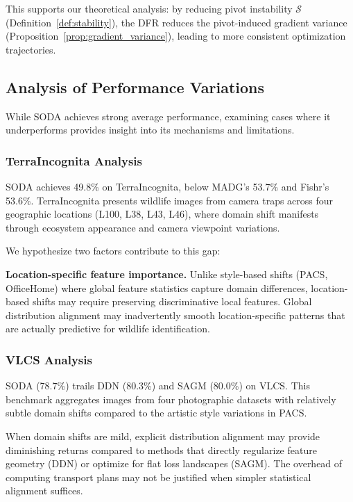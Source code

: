 \documentclass[preprint,12pt]{elsarticle}
\providecommand{\DIFadd}[1]{{\protect\color{blue} \sf #1}} %
\providecommand{\DIFaddbegin}{} %
\providecommand{\DIFaddend}{} %
\newcommand{\DIFaddincludegraphics}[2][]{{\color{blue}\fbox{\DIFOincludegraphics[#1]{#2}}}} %
\DeclareRobustCommand{\DIFaddbegin}{\DIFOaddbegin \let\includegraphics\DIFaddincludegraphics} %
\DeclareRobustCommand{\DIFaddend}{\DIFOaddend \let\includegraphics\DIFOincludegraphics} %
\begin{document}
\DIFadd{This }\DIFaddend supports our theoretical analysis: by reducing pivot instability $\mathcal{S}$ (Definition~\ref{def:stability}), the DFR reduces \DIFaddbegin \DIFadd{the pivot-induced }\DIFaddend gradient variance (Proposition~\ref{prop:gradient_variance}), leading to more consistent optimization trajectories.

\subsection{Analysis of Performance Variations}
\label{ssec:failure_analysis}

While SODA achieves strong average performance, examining cases where it underperforms provides insight into its mechanisms and limitations.

\subsubsection{TerraIncognita Analysis}

SODA achieves 49.8\% on TerraIncognita, below MADG's 53.7\% and Fishr's 53.6\%. TerraIncognita presents wildlife images from camera traps across four geographic locations (L100, L38, L43, L46), where domain shift manifests through ecosystem appearance and camera viewpoint variations.

We hypothesize two factors contribute to this gap:
\begin{sloppypar} 
\textbf{Location-specific feature importance.} Unlike style-based shifts (PACS, OfficeHome) where global feature statistics capture domain differences, location-based shifts may require preserving discriminative local features. Global distribution alignment may inadvertently smooth location-specific patterns that are actually predictive for wildlife identification.
\end{sloppypar} 
\subsubsection{VLCS Analysis}

SODA (78.7\%) trails DDN (80.3\%) and SAGM (80.0\%) on VLCS. This benchmark aggregates images from four photographic datasets with relatively subtle domain shifts compared to the artistic style variations in PACS.

When domain shifts are mild, explicit distribution alignment may provide diminishing returns compared to methods that directly regularize feature geometry (DDN) or optimize for flat loss landscapes (SAGM). The overhead of computing transport plans may not be justified when simpler statistical alignment suffices.
\end{document}
